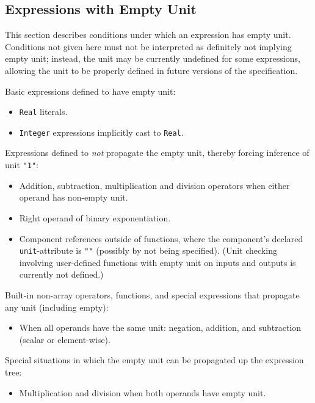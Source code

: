 \subsection{Expressions with Empty Unit}\label{expressions-with-empty-unit}

This section describes conditions under which an expression has empty unit.
Conditions not given here must not be interpreted as definitely not implying empty unit; instead, the unit may be currently undefined for some expressions, allowing the unit to be properly defined in future versions of the specification.

Basic expressions defined to have empty unit:
\begin{itemize}
\item
  \lstinline!Real! literals.
\item
  \lstinline!Integer! expressions implicitly cast to \lstinline!Real!.
\end{itemize}

Expressions defined to \emph{not} propagate the empty unit, thereby forcing inference of unit \lstinline!"1"!:
\begin{itemize}
\item
  Addition, subtraction, multiplication and division operators when either operand has non-empty unit.
\item
  Right operand of binary exponentiation.
\item
  Component references outside of functions, where the component's declared \lstinline!unit!-attribute is \lstinline!""! (possibly by not being specified).
  (Unit checking involving user-defined functions with empty unit on inputs and outputs is currently not defined.)
\end{itemize}

Built-in non-array operators, functions, and special expressions that propagate any unit (including empty):
\begin{itemize}
\item
  When all operands have the same unit: negation, addition, and subtraction (scalar or element-wise).
\end{itemize}

Special situations in which the empty unit can be propagated up the expression tree:
\begin{itemize}
\item
  Multiplication and division when both operands have empty unit.
\end{itemize}

